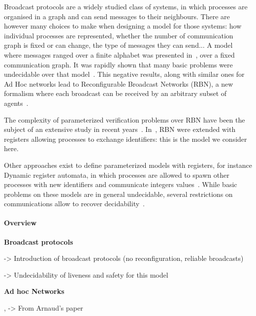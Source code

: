 Broadcast protocols are a widely studied class of systems, in which processes are organised in a graph and can send messages to their neighbours. There are however many choices to make when designing a model for those systems: how individual processes are represented, whether the number of communication graph is fixed or can change, the type of messages they can send... 
A model where messages ranged over a finite alphabet was presented in~\cite{emerson1998model}, over a fixed communication graph. It was rapidly shown that many basic problems were undecidable over that model~\cite{EsparzaFM1999verification}. This negative results, along with similar ones for Ad Hoc networks lead to Reconfigurable Broadcast Networks (RBN), a new formalism where each broadcast can be received by an arbitrary subset of agents~\cite{DelzannoSZ2010Adhoc}.

The complexity of parameterized verification problems over RBN have been the subject of an extensive study in recent years~\cite{Delzanno2012complexity, BalasubramanianBM2018parameterized, BalasubramanianGW2022parameterized, ChiniMS2019liveness}. In~\cite{DST2013}, RBN were extended with registers allowing processes to exchange identifiers: this is the model we consider here. 

Other approaches exist to define parameterized models with registers, for instance Dynamic register automata, in which processes are allowed to spawn other processes with new identifiers and communicate integers values~\cite{AbdullaAKR2014verification}. While basic problems on these models are in general undecidable, several restrictions on communications allow to recover decidability~\cite{AbdullaAKR2015verification, AbdullaAA2016data, Rezine2017verification}.



\paragraph*{Overview}



	\textbf{Broadcast protocols}

	\cite{emerson1998model} -> Introduction of broadcast protocols (no reconfiguration, reliable broadcasts)
	
	\cite{EsparzaFM1999verification} -> Undecidability of liveness and safety for this model

	\textbf{Ad hoc Networks}

	\cite{Godskesen2007calculus}, \cite{Merro2007observational} -> From Arnaud's paper

